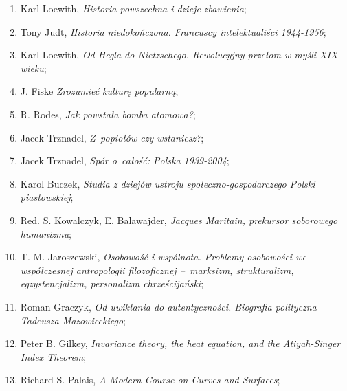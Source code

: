 \documentclass[a4paper,11pt]{article}
\begin{document}
\begin{enumerate}
\item Karl Loewith, \textit{Historia powszechna i dzieje zbawienia};



\item Tony Judt, \textit{Historia niedokończona. Francuscy
    intelektualiści 1944-1956};



\item Karl Loewith, \textit{Od Hegla do Nietzschego. Rewolucyjny przełom
    w myśli XIX wieku};



\item J. Fiske \textit{Zrozumieć kulturę popularną};



\item R. Rodes, \textit{Jak powstała bomba atomowa?};



\item Jacek Trznadel, \textit{Z~popiołów czy wstaniesz?};



\item Jacek Trznadel, \textit{Spór o~całość: Polska 1939-2004};



\item Karol Buczek, \textit{Studia z dziejów ustroju
    społeczno-gospodarczego Polski piastowskiej};



\item Red. S. Kowalczyk, E. Balawajder, \textit{Jacques Maritain,
    prekursor soborowego humanizmu};



\item T. M. Jaroszewski, \textit{Osobowość i wspólnota. Problemy
    osobowości we współczesnej antropologii filozoficznej --~marksizm,
    strukturalizm, egzystencjalizm, personalizm chrześcijański};



\item Roman Graczyk, \textit{Od uwikłania do autentyczności. Biografia
    polityczna Tadeusza Mazowieckiego};



\item Peter B. Gilkey, \textit{Invariance theory, the heat equation, and
    the Atiyah-Singer Index Theorem};



\item Richard S. Palais, \textit{A Modern Course on Curves and
    Surfaces};




\end{enumerate}
\end{document}
